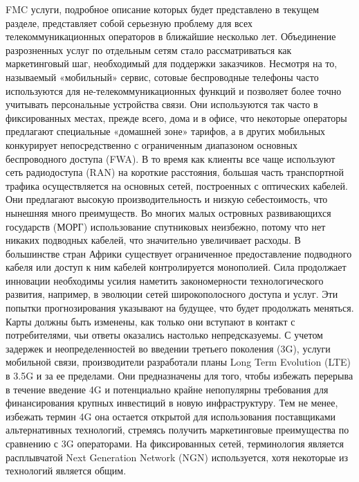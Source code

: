 FMC услуги, подробное описание которых будет представлено в текущем разделе, представляет собой серьезную проблему для всех телекоммуникационных операторов в ближайшие несколько лет. Объединение разрозненных услуг по отдельным сетям стало рассматриваться как маркетинговый шаг, необходимый для поддержки заказчиков.
Несмотря на то, называемый «мобильный» сервис, сотовые беспроводные телефоны часто используются для не-телекоммуникационных функций и позволяет более точно учитывать персональные устройства связи. Они используются так часто в фиксированных местах, прежде всего, дома и в офисе, что некоторые операторы предлагают специальные «домашней зоне» тарифов, а в других мобильных конкурирует непосредственно с ограниченным диапазоном основных беспроводного доступа (FWA).
В то время как клиенты все чаще используют сеть радиодоступа (RAN) на короткие расстояния, большая часть транспортной трафика осуществляется на основных сетей, построенных с оптических кабелей. Они предлагают высокую производительность и низкую себестоимость, что нынешняя много преимуществ. Во многих малых островных развивающихся государств (МОРГ) использование спутниковых неизбежно, потому что нет никаких подводных кабелей, что значительно увеличивает расходы. В большинстве стран Африки существует ограниченное предоставление подводного кабеля или доступ к ним кабелей контролируется монополией.
Сила продолжает инновации необходимы усилия наметить закономерности технологического развития, например, в эволюции сетей широкополосного доступа и услуг. Эти попытки прогнозирования указывают на будущее, что будет продолжать меняться. Карты должны быть изменены, как только они вступают в контакт с потребителями, чьи ответы оказались настолько непредсказуемы.
С учетом задержек и неопределенностей во введении третьего поколения (3G), услуги мобильной связи, производители разработали планы Long Term Evolution (LTE) в 3.5G и за ее пределами. Они предназначены для того, чтобы избежать перерыва в течение введение 4G и потенциально крайне непопулярны требования для финансирования крупных инвестиций в новую инфраструктуру. Тем не менее, избежать термин 4G она остается открытой для использования поставщиками альтернативных технологий, стремясь получить маркетинговые преимущества по сравнению с 3G операторами. На фиксированных сетей, терминология является расплывчатой Next Generation Network (NGN) используется, хотя некоторые из технологий является общим.

